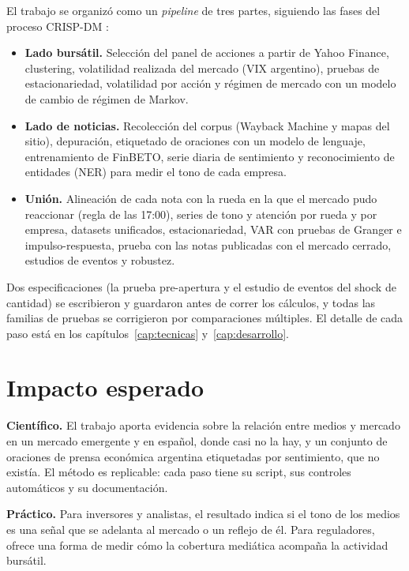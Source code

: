 El trabajo se organizó como un \textit{pipeline} de tres partes, siguiendo las fases del
proceso CRISP-DM \citep{wirth2000crispdm}:

\begin{itemize}
  \item \textbf{Lado bursátil.} Selección del panel de acciones a partir de Yahoo Finance,
        clustering, volatilidad realizada del mercado (VIX argentino), pruebas de
        estacionariedad, volatilidad por acción y régimen de mercado con un modelo de cambio
        de régimen de Markov.
  \item \textbf{Lado de noticias.} Recolección del corpus (Wayback Machine y mapas del sitio),
        depuración, etiquetado de oraciones con un modelo de lenguaje, entrenamiento de
        FinBETO, serie diaria de sentimiento y reconocimiento de entidades (NER) para medir el
        tono de cada empresa.
  \item \textbf{Unión.} Alineación de cada nota con la rueda en la que el mercado pudo
        reaccionar (regla de las 17:00), series de tono y atención por rueda y por empresa,
        datasets unificados, estacionariedad, VAR con pruebas de Granger e impulso-respuesta,
        prueba con las notas publicadas con el mercado cerrado, estudios de eventos y
        robustez.
\end{itemize}

Dos especificaciones (la prueba pre-apertura y el estudio de eventos del shock de cantidad)
se escribieron y guardaron antes de correr los cálculos, y todas las familias de pruebas se
corrigieron por comparaciones múltiples. El detalle de cada paso está en los
capítulos~\ref{cap:tecnicas} y~\ref{cap:desarrollo}.

\section{Impacto esperado}

\textbf{Científico.} El trabajo aporta evidencia sobre la relación entre medios y mercado en un
mercado emergente y en español, donde casi no la hay, y un conjunto de oraciones de prensa
económica argentina etiquetadas por sentimiento, que no existía. El método es replicable:
cada paso tiene su script, sus controles automáticos y su documentación.

\textbf{Práctico.} Para inversores y analistas, el resultado indica si el tono de los medios
es una señal que se adelanta al mercado o un reflejo de él. Para reguladores, ofrece una forma
de medir cómo la cobertura mediática acompaña la actividad bursátil.

